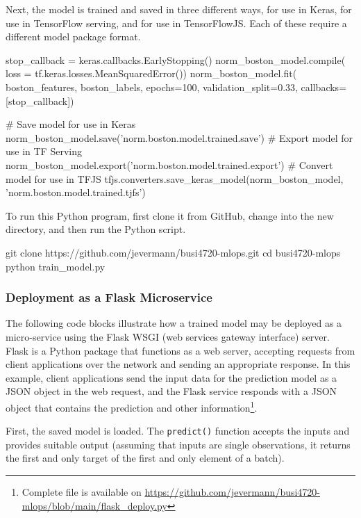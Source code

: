 Next, the model is trained and saved in three different ways, for use in Keras, for use in TensorFlow serving, and for use in TensorFlowJS. Each of these require a different model package format.

\begin{pythoncode}
stop_callback = keras.callbacks.EarlyStopping()
norm_boston_model.compile(
    loss = tf.keras.losses.MeanSquaredError())
norm_boston_model.fit(
    boston_features, boston_labels,
    epochs=100, validation_split=0.33,
    callbacks=[stop_callback])

# Save model for use in Keras
norm_boston_model.save('norm.boston.model.trained.save')
# Export model for use in TF Serving
norm_boston_model.export('norm.boston.model.trained.export')
# Convert model for use in TFJS
tfjs.converters.save_keras_model(norm_boston_model,
    'norm.boston.model.trained.tjfs')
\end{pythoncode}

To run this Python program, first clone it from GitHub, change into the new directory, and then run the Python script.

\begin{bashcode}
git clone https://github.com/jevermann/busi4720-mlops.git
cd busi4720-mlops
python train_model.py
\end{bashcode}

\subsubsection*{Deployment as a Flask Microservice}

The following code blocks illustrate how a trained model may be deployed as a micro-service using the Flask WSGI (web services gateway interface) server. Flask is a Python package that functions as a web server, accepting requests from client applications over the network and sending an appropriate response. In this example, client applications send the input data for the prediction model as a JSON object in the web request, and the Flask service responds with a JSON object that contains the prediction and other information\footnote{Complete file is available on \url{https://github.com/jevermann/busi4720-mlops/blob/main/flask_deploy.py}}.

First, the saved model is loaded. The \texttt{predict()} function accepts the inputs and provides suitable output (assuming that inputs are single observations, it returns the first and only target of the first and only element of a batch).

